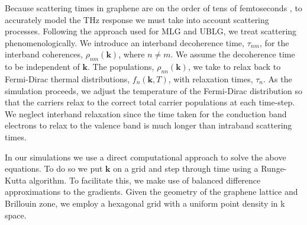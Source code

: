 \documentclass[twocolumn,secnumarabic,amssymb, nobibnotes, aps, prd, superscriptaddress]{revtex4-1}
\begin{document}
Because scattering times in graphene are on the order of tens of femtoseconds \cite{bowlan2014ultrafast}\cite{paul2013high}, to accurately model the THz response we must take into account scattering processes. Following the approach used for MLG and UBLG\cite{al2014high, mcgouran2016nonlinear}, we treat scattering phenomenologically. We introduce an interband decoherence time, $\tau_{nm}$, for the interband coherences, $\rho_{nm}(\mathbf{k})$, where $n\neq m$. We assume the decoherence time to be independent of $\mathbf{k}$. The populations, $\rho_{nn}(\mathbf{k})$, we take to relax back to Fermi-Dirac thermal distributions, $f_{n}(\mathbf{k},T)$, with relaxation times, $\tau_{n}$. As the simulation proceeds, we adjust the temperature of the Fermi-Dirac distribution so that the carriers relax to the correct total carrier populations at each time-step. We neglect interband relaxation since the time taken for the conduction band electrons to relax to the valence band is much longer than intraband scattering times\cite{tielrooij2013}.

In our simulations we use a direct computational approach to solve the above equations. To do so we put $\mathbf{k}$ on a grid and step through time using a Runge-Kutta algorithm. To facilitate this, we make use of balanced difference approximations to the gradients. Given the geometry of the graphene lattice and Brillouin zone, we employ a hexagonal grid with a uniform point density in k space.
\end{document}
